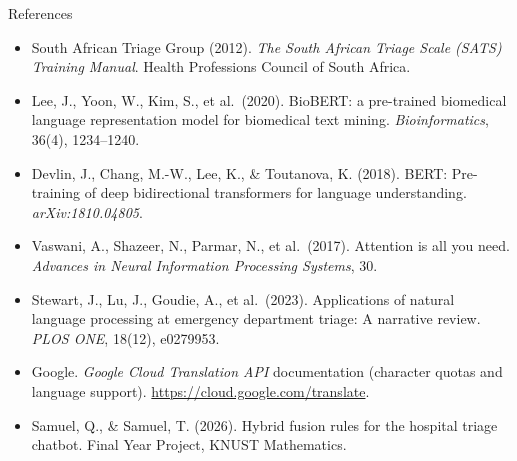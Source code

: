 \documentclass[aspectratio=169,11pt]{beamer}
\begin{document}
\begin{frame}{References}
	\scriptsize
	\setlength{\itemsep}{0.15em}
	\begin{itemize}
		\item South African Triage Group (2012). \textit{The South African Triage Scale (SATS) Training Manual}. Health Professions Council of South Africa.
		\item Lee, J., Yoon, W., Kim, S., et al.\ (2020). BioBERT: a pre-trained biomedical language representation model for biomedical text mining. \textit{Bioinformatics}, 36(4), 1234--1240.
		\item Devlin, J., Chang, M.-W., Lee, K., \& Toutanova, K. (2018). BERT: Pre-training of deep bidirectional transformers for language understanding. \textit{arXiv:1810.04805}.
		\item Vaswani, A., Shazeer, N., Parmar, N., et al.\ (2017). Attention is all you need. \textit{Advances in Neural Information Processing Systems}, 30.
		\item Stewart, J., Lu, J., Goudie, A., et al.\ (2023). Applications of natural language processing at emergency department triage: A narrative review. \textit{PLOS ONE}, 18(12), e0279953.
		\item Google. \textit{Google Cloud Translation API} documentation (character quotas and language support). \url{https://cloud.google.com/translate}.
		\item Samuel, Q., \& Samuel, T. (2026). Hybrid fusion rules for the hospital triage chatbot. Final Year Project, KNUST Mathematics.
	\end{itemize}
\end{frame}
\end{document}
